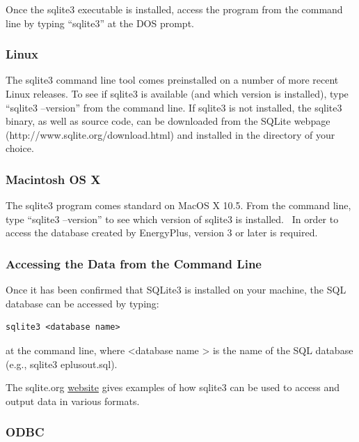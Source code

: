 Once the sqlite3 executable is installed, access the program from the command line by typing ``sqlite3'' at the DOS prompt.

\subsubsection{Linux}\label{linux}

The sqlite3 command line tool comes preinstalled on a number of more recent Linux releases. To see if sqlite3 is available (and which version is installed), type ``sqlite3 --version'' from the command line. If sqlite3 is not installed, the sqlite3 binary, as well as source code, can be downloaded from the SQLite webpage (http://www.sqlite.org/download.html) and installed in the directory of your choice.

\subsubsection{Macintosh OS X}\label{macintosh-os-x}

The sqlite3 program comes standard on MacOS X 10.5. From the command line, type ``sqlite3 --version'' to see which version of sqlite3 is installed.~ In order to access the database created by EnergyPlus, version 3 or later is required.

\subsubsection{Accessing the Data from the Command Line}\label{accessing-the-data-from-the-command-line}

Once it has been confirmed that SQLite3 is installed on your machine, the SQL database can be accessed by typing:

\begin{lstlisting}
sqlite3 <database name>
\end{lstlisting}

at the command line, where \textless{}database name \textgreater{} is the name of the SQL database (e.g., sqlite3 eplusout.sql).

The sqlite.org \href{http://www.sqlite.org/sqlite.html}{website} gives examples of how sqlite3 can be used to access and output data in various formats.

\subsubsection{ODBC}\label{odbc}

